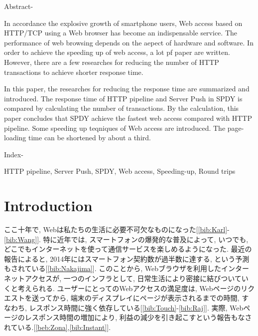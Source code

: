 \documentclass[twocolumn]{jsarticle}
\begin{document}

\begin{spacing}{0.7}
\begin{bfseries}
\small{
\begin{itshape}
Abstract-
\end{itshape}
In accordance the explosive growth of smartphone users, Web access based on
HTTP/TCP using a Web browser has become an indispensable service.
The performance of web browsing depends on the aepect of hardware and software.
In order to achieve the speeding up of web access, a lot
pf paper are written.
However, there are a few researches for reducing the number of HTTP transactions
to achieve shorter response time.

In this paper, the researches for reducing the response time are summarized and
introduced.
The response time of HTTP pipeline and Server Push in SPDY is compared by
calculating the number of transactions.
By the calculation, this paper concludes that SPDY achieve the fastest web
access compared with HTTP pipeline.
Some speeding up teqniques of Web access are introduced.
The page-loading time can be shortened by about a third.\\

\begin{itshape}
Index-
\end{itshape}
HTTP pipeline, Server Push, SPDY, Web access, Speeding-up, Round trips
}
\end{bfseries}
\end{spacing}
\section{Introduction}
ここ十年で, Webは私たちの生活に必要不可欠なものになった[\ref{bib:Karl}-\ref{bib:Wang}].
特に近年では, スマートフォンの爆発的な普及によって, いつでも, どこでもインターネットを使って通信サービスを楽しめるようになった.
最近の報告によると, 2014年にはスマートフォン契約数が過半数に達する,
という予測もされている[\ref{bib:Nakajima}].
このことから, Webブラウザを利用したインターネットアクセスが, 一つのインフラとして, 日常生活により密接に結びついていくと考えられる.
ユーザーにとってのWebアクセスの満足度は, Webページのリクエストを送ってから, 端末のディスプレイにページが表示されるまでの時間, すなわち,
レスポンス時間に強く依存している[\ref{bib:Touch}-\ref{bib:Raj}].
実際, Webページのレスポンス時間の増加により,
利益の減少を引き起こすという報告もなされている.[\ref{beb:Zona},\ref{bib:Instant}].
\end{document}
